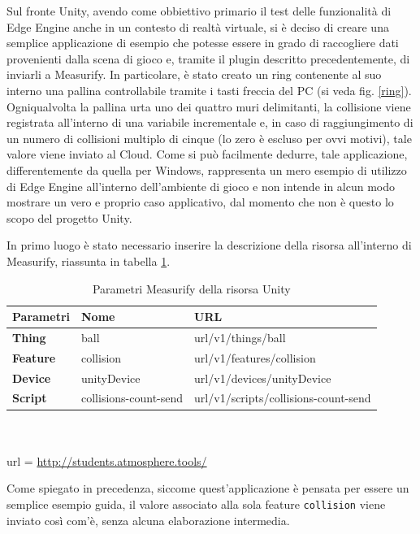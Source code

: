 Sul fronte Unity, avendo come obbiettivo primario il test delle funzionalità di Edge Engine anche in un contesto di realtà virtuale, si è deciso di creare una semplice applicazione di esempio che potesse essere in grado di raccogliere dati provenienti dalla scena di gioco e, tramite il plugin descritto precedentemente, di inviarli a Measurify. In particolare, è stato creato un ring contenente al suo interno una pallina controllabile tramite i tasti freccia del PC (si veda fig. \ref{ring}). Ogniqualvolta la pallina urta uno dei quattro muri delimitanti, la collisione viene registrata all'interno di una variabile incrementale e, in caso di raggiungimento di un numero di collisioni multiplo di cinque (lo zero è escluso per ovvi motivi), tale valore viene inviato al Cloud. Come si può facilmente dedurre, tale applicazione, differentemente da quella per Windows, rappresenta un mero esempio di utilizzo di Edge Engine all'interno dell'ambiente di gioco e non intende in alcun modo mostrare un vero e proprio caso applicativo, dal momento che non è questo lo scopo del progetto Unity.

In primo luogo è stato necessario inserire la descrizione della risorsa all'interno di Measurify, riassunta in tabella \ref{descunitydev}.

\begin{table}[H]
	\begin{tabular}{|p{}|p{}|p{}|}
		\hline
		\textbf{Parametri} & \textbf{Nome} & \textbf{URL}\\
		\hline
		\textbf{Thing} & ball & {{url}}/v1/things/ball\\
		\hline
		\textbf{Feature} & collision & {{url}}/v1/features/collision\\
		\hline
		\textbf{Device} & unityDevice & {{url}}/v1/devices/unityDevice\\    
		\hline
		\textbf{Script} & collisions-count-send & {{url}}/v1/scripts/collisions-count-send\\    
		\hline
	\end{tabular}
	\\\\url = \url{http://students.atmosphere.tools/}
	\caption{Parametri Measurify della risorsa Unity}
	\label{descunitydev}
\end{table}

Come spiegato in precedenza, siccome quest'applicazione è pensata per essere un semplice esempio guida, il valore associato alla sola feature \texttt{collision} viene inviato così com'è, senza alcuna elaborazione intermedia.

